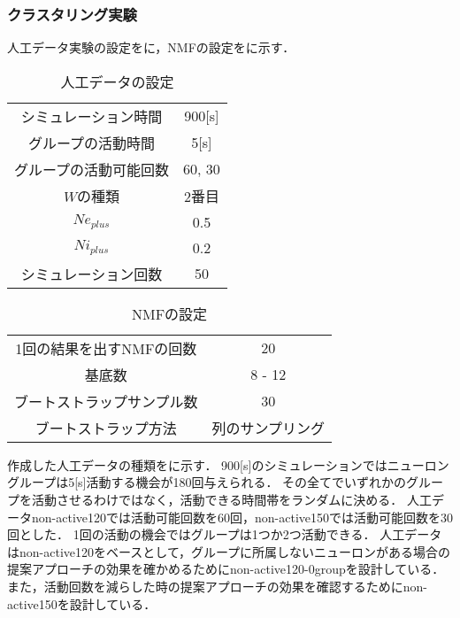 \subsubsection{クラスタリング実験}
人工データ実験の設定をに，NMFの設定をに示す．
\begin{table}[htb]
  \center
  \begin{tabular}{c|c} \hline
		シミュレーション時間 & 900[s]\\
		グループの活動時間 & 5[s] \\
		グループの活動可能回数 & 60, 30 \\
		$W$の種類 & 2番目 \\
		$Ne_{plus}$ & 0.5 \\
		$Ni_{plus}$ & 0.2\\
		シミュレーション回数 & 50\\ \hline
  \end{tabular}
  \caption{人工データの設定}
  \label{tab:exp2param1}
\end{table}

\begin{table}[htb]
  \center
  \begin{tabular}{c|c} \hline
		1回の結果を出すNMFの回数 & 20 \\
		基底数 & 8 - 12 \\
		ブートストラップサンプル数 & 30 \\
		ブートストラップ方法 & 列のサンプリング \\ \hline
  \end{tabular}
  \caption{NMFの設定}
  \label{tab:exp2param2}
\end{table}
作成した人工データの種類をに示す．
900[s]のシミュレーションではニューロングループは5[s]活動する機会が180回与えられる．
その全てでいずれかのグループを活動させるわけではなく，活動できる時間帯をランダムに決める．
人工データnon-active120では活動可能回数を60回，non-active150では活動可能回数を30回とした．
1回の活動の機会ではグループは1つか2つ活動できる．
人工データはnon-active120をベースとして，グループに所属しないニューロンがある場合の提案アプローチの効果を確かめるためにnon-active120-0groupを設計している．
また，活動回数を減らした時の提案アプローチの効果を確認するためにnon-active150を設計している．

